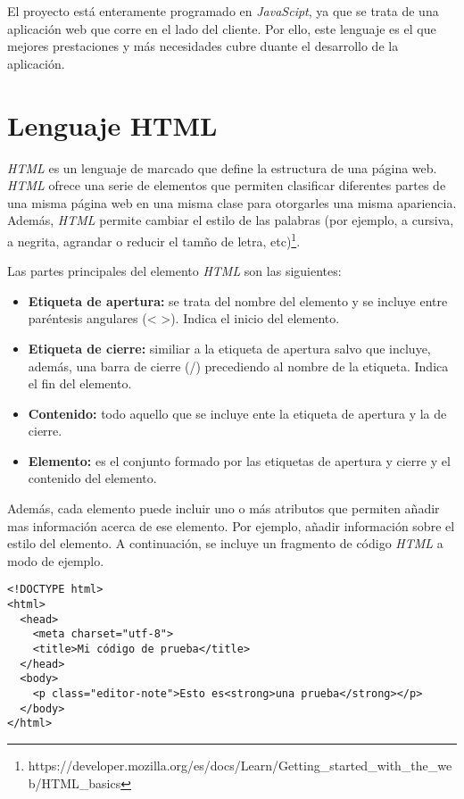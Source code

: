 El proyecto está enteramente programado en \textit{JavaScipt}, ya que se trata de una aplicación web que corre en el lado del cliente. Por ello, este lenguaje es el que mejores prestaciones y más necesidades cubre duante el desarrollo de la aplicación.

\section{Lenguaje HTML}
\textit{HTML} es un lenguaje de marcado que define la estructura de una página web. \textit{HTML} ofrece una serie de elementos que permiten clasificar diferentes partes de una misma página web en una misma clase para otorgarles una misma apariencia. Además, \textit{HTML} permite cambiar el estilo de las palabras (por ejemplo, a cursiva, a negrita, agrandar o reducir el tamño de letra, etc)\footnote{https://developer.mozilla.org/es/docs/Learn/Getting_started_with_the_web/HTML_basics}. \newline

Las partes principales del elemento \textit{HTML} son las siguientes:
\begin{itemize}
    \item \textbf{Etiqueta de apertura:} se trata del nombre del elemento y se incluye entre paréntesis angulares (< >). Indica el inicio del elemento.
    \item \textbf{Etiqueta de cierre:} similiar a la etiqueta de apertura salvo que incluye, además, una barra de cierre (/) precediendo al nombre de la etiqueta. Indica el fin del elemento.
    \item \textbf{Contenido: }todo aquello que se incluye ente la etiqueta de apertura y la de cierre.
    \item \textbf{Elemento: }es el conjunto formado por las etiquetas de apertura y cierre y el contenido del elemento.
\end{itemize}

Además, cada elemento puede incluir uno o más atributos que permiten añadir mas información acerca de ese elemento. Por ejemplo, añadir información sobre el estilo del elemento. A continuación, se incluye un fragmento de código \textit{HTML} a modo de ejemplo. 
\begin{verbatim}
<!DOCTYPE html>
<html>
  <head>
    <meta charset="utf-8">
    <title>Mi código de prueba</title>
  </head>
  <body>
    <p class="editor-note">Esto es<strong>una prueba</strong></p>
  </body>
</html>
\end{verbatim}

